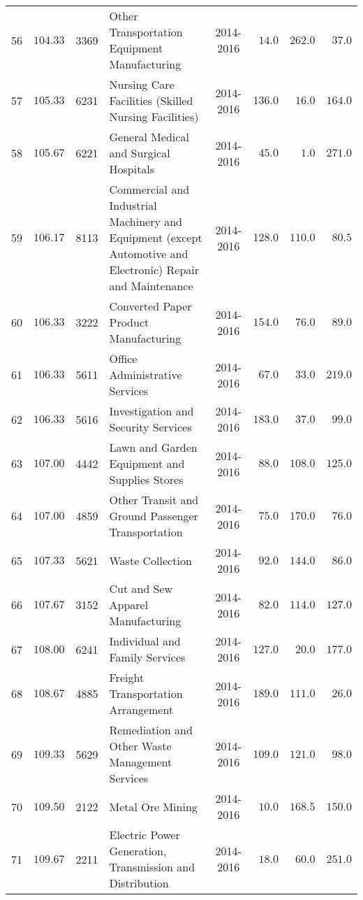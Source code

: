\documentclass[9pt, oneside]{article}   	%
\begin{document}
\begin{longtable}{cccp{2.0in}cccc}
56  & $104.33$ & 3369 & Other Transportation Equipment Manufacturing & 2014-2016 & $\phantom{0}14.0$ & $262.0$ & $\phantom{0}37.0$ \\
57  & $105.33$ & 6231 & Nursing Care Facilities (Skilled Nursing Facilities) & 2014-2016 & $136.0$ & $\phantom{0}16.0$ & $164.0$ \\
58  & $105.67$ & 6221 & General Medical and Surgical Hospitals & 2014-2016 & $\phantom{0}45.0$ & $\phantom{00}1.0$ & $271.0$ \\
59  & $106.17$ & 8113 & Commercial and Industrial Machinery and Equipment (except Automotive and Electronic) Repair and Maintenance & 2014-2016 & $128.0$ & $110.0$ & $\phantom{0}80.5$ \\
60  & $106.33$ & 3222 & Converted Paper Product Manufacturing & 2014-2016 & $154.0$ & $\phantom{0}76.0$ & $\phantom{0}89.0$ \\
61  & $106.33$ & 5611 & Office Administrative Services & 2014-2016 & $\phantom{0}67.0$ & $\phantom{0}33.0$ & $219.0$ \\
62  & $106.33$ & 5616 & Investigation and Security Services & 2014-2016 & $183.0$ & $\phantom{0}37.0$ & $\phantom{0}99.0$ \\
63  & $107.00$ & 4442 & Lawn and Garden Equipment and Supplies Stores & 2014-2016 & $\phantom{0}88.0$ & $108.0$ & $125.0$ \\
64  & $107.00$ & 4859 & Other Transit and Ground Passenger Transportation & 2014-2016 & $\phantom{0}75.0$ & $170.0$ & $\phantom{0}76.0$ \\
65  & $107.33$ & 5621 & Waste Collection & 2014-2016 & $\phantom{0}92.0$ & $144.0$ & $\phantom{0}86.0$ \\
66  & $107.67$ & 3152 & Cut and Sew Apparel Manufacturing & 2014-2016 & $\phantom{0}82.0$ & $114.0$ & $127.0$ \\
67  & $108.00$ & 6241 & Individual and Family Services & 2014-2016 & $127.0$ & $\phantom{0}20.0$ & $177.0$ \\
68  & $108.67$ & 4885 & Freight Transportation Arrangement & 2014-2016 & $189.0$ & $111.0$ & $\phantom{0}26.0$ \\
69  & $109.33$ & 5629 & Remediation and Other Waste Management Services & 2014-2016 & $109.0$ & $121.0$ & $\phantom{0}98.0$ \\
70  & $109.50$ & 2122 & Metal Ore Mining & 2014-2016 & $\phantom{0}10.0$ & $168.5$ & $150.0$ \\
71  & $109.67$ & 2211 & Electric Power Generation, Transmission and Distribution & 2014-2016 & $\phantom{0}18.0$ & $\phantom{0}60.0$ & $251.0$ \\

\end{longtable}
\end{document}
